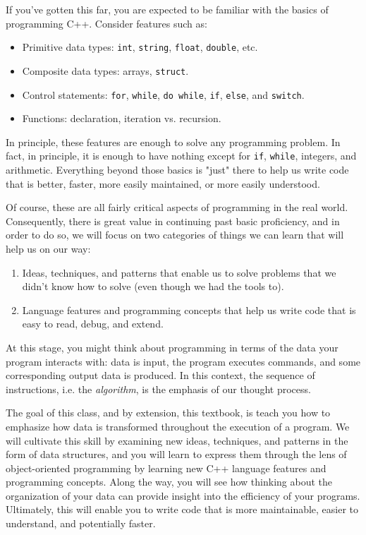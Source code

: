 If you've gotten this far, you are expected to be familiar with the basics of programming C++.
Consider features such as:

\begin{itemize}
	\item Primitive data types: \texttt{int}, \texttt{string}, \texttt{float}, \texttt{double}, etc.
	\item Composite data types: arrays, \texttt{struct}.
	\item Control statements: \texttt{for}, \texttt{while}, \texttt{do while}, \texttt{if}, \texttt{else}, and \texttt{switch}.
	\item Functions: declaration, iteration vs. recursion.
\end{itemize}

In principle, these features are enough to solve any programming problem.
In fact, in principle, it is enough to have nothing except for \texttt{if}, \texttt{while}, integers, and arithmetic.
Everything beyond those basics is "just" there to help us write code that is better, faster, more easily maintained, or more easily understood.

Of course, these are all fairly critical aspects of programming in the real world.
Consequently, there is great value in continuing past basic proficiency, and in order to do so, we will focus on two categories of things we can learn that will help us on our way:

\begin{enumerate}
\item Ideas, techniques, and patterns that enable us to solve problems that we didn't know how to solve (even though we had the tools to).
\item Language features and programming concepts that help us write code that is easy to read, debug, and extend.
\end{enumerate}

At this stage, you might think about programming in terms of the data your program interacts with: data is input, the program executes commands, and some corresponding output data is produced.
In this context, the sequence of instructions, i.e. the \emph{algorithm}, is the emphasis of our thought process.

The goal of this class, and by extension, this textbook, is teach you how to emphasize how data is transformed throughout the execution of a program.
We will cultivate this skill by examining new ideas, techniques, and patterns in the form of data structures, and you will learn to express them through the lens of object-oriented programming by learning new C++ language features and programming concepts.
Along the way, you will see how thinking about the organization of your data can provide insight into the efficiency of your programs.
Ultimately, this will enable you to write code that is more maintainable, easier to understand, and potentially faster.

